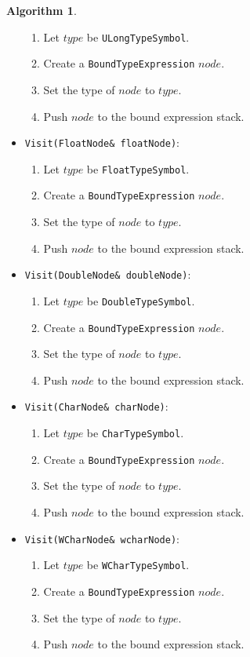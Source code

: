 \documentclass[a4paper,oneside,11pt]{book}
\theoremstyle{definition}
\newtheorem{algo}{Algorithm}[section]
\begin{document}
\begin{algo}
\begin{itemize}
\begin{enumerate}
\item
Let $type$ be \verb|ULongTypeSymbol|.
\item
Create a \verb|BoundTypeExpression| $node$.
\item
Set the type of $node$ to $type$.
\item
Push $node$ to the bound expression stack.
\end{enumerate}
\item
\verb|Visit(FloatNode& floatNode)|:
\begin{enumerate}
\item
Let $type$ be \verb|FloatTypeSymbol|.
\item
Create a \verb|BoundTypeExpression| $node$.
\item
Set the type of $node$ to $type$.
\item
Push $node$ to the bound expression stack.
\end{enumerate}
\item
\verb|Visit(DoubleNode& doubleNode)|:
\begin{enumerate}
\item
Let $type$ be \verb|DoubleTypeSymbol|.
\item
Create a \verb|BoundTypeExpression| $node$.
\item
Set the type of $node$ to $type$.
\item
Push $node$ to the bound expression stack.
\end{enumerate}
\item
\verb|Visit(CharNode& charNode)|:
\begin{enumerate}
\item
Let $type$ be \verb|CharTypeSymbol|.
\item
Create a \verb|BoundTypeExpression| $node$.
\item
Set the type of $node$ to $type$.
\item
Push $node$ to the bound expression stack.
\end{enumerate}
\item
\verb|Visit(WCharNode& wcharNode)|:
\begin{enumerate}
\item
Let $type$ be \verb|WCharTypeSymbol|.
\item
Create a \verb|BoundTypeExpression| $node$.
\item
Set the type of $node$ to $type$.
\item
Push $node$ to the bound expression stack.
\end{enumerate}

\end{itemize}
\end{algo}
\end{document}
